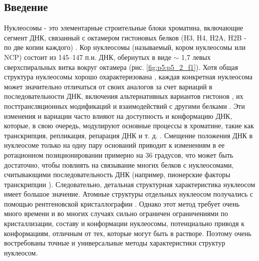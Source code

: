 \subsection{Введение}
Нуклеосомы - это элементарные строительные блоки хроматина, включающие сегмент ДНК, связанный с октамером гистоновых белков (H3, H4, H2A, H2B - по две копии каждого) \cite{kornberg_chromatin_1974-1}. Кор нуклеосомы (называемый, кором нуклеосомы или NCP) состоит из 145–147 п.н. ДНК, обернутых в виде $\sim$ 1,7 левых сверхспиральных витка вокруг октамера \cite{luger_crystal_1997} (рис. \ref{fig:p5:p5_2_f1}). Хотя общая структура нуклеосомы хорошо охарактеризована \cite{tan_nucleosome_2011}, каждая конкретная нуклеосома может значительно отличаться от своих аналогов за счет вариаций в последовательности ДНК, включения альтернативных вариантов гистонов \cite{draizen_histonedb_2016,shaytan_nucleosome_2015}, их посттрансляционных модификаций \cite{gardner_operating_2011} и взаимодействий с другими белками \cite{xiao_nonhistone_2011,becker_nucleosome_2013}. Эти изменения и вариации часто влияют на доступность и конформацию ДНК, которые, в свою очередь, модулируют основные процессы в хроматине, такие как транскрипция, репликация, репарация ДНК и т. д. \cite{gaykalova_structural_2015,luger_new_2012}. Смещение положения ДНК в нуклеосоме только на одну пару оснований приводит к изменениям в ее ротационном позиционировании примерно на 36 градусов, что может быть достаточно, чтобы повлиять на связывание многих белков с нуклеосомами, считывающими последовательность ДНК (например, пионерские факторы транскрипции \cite{iwafuchi-doi_pioneer_2014,cui_rotational_2014}). Следовательно, детальная структурная характеристика нуклеосом имеет большое значение. Атомные структуры отдельных нуклеосом получались с помощью рентгеновской кристаллографии \cite{tan_nucleosome_2011}. Однако этот метод требует очень много времени и во многих случаях сильно ограничен ограничениями по кристаллизации, составу и конформации нуклеосомы, потенциально приводя к конформациям, отличным от тех, которые могут быть в растворе. Поэтому очень востребованы точные и универсальные методы характеристики структур нуклеосом.

